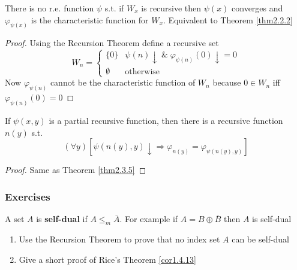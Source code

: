 \documentclass[11pt]{article}
\begin{document}
\begin{theorem}[]
\label{thm2.3.6}
There is no r.e. function \(\psi\) s.t. if \(W_x\) is recursive then \(\psi(x)\)
converges and \(\varphi_{\psi(x)}\) is the characteristic function for
\(W_x\). Equivalent to Theorem \ref{thm2.2.2}
\end{theorem}

\begin{proof}
Using the Recursion Theorem define a recursive set
\begin{equation*}
W_n=
\begin{cases}
\{0\}&\psi(n)\downarrow\;\&\;
\varphi_{\psi(n)}(0)\downarrow=0\\
\emptyset&\text{otherwise}
\end{cases}
\end{equation*}
Now \(\varphi_{\psi(n)}\) cannot be the characteristic function of \(W_n\)
because \(0\in W_n\) iff \(\varphi_{\psi(n)}(0)=0\)
\end{proof}

\begin{theorem}[]
\label{thm2.3.7}
If \(\psi(x,y)\) is a partial recursive function, then there is a recursive
function \(n(y)\) s.t.
\begin{equation*}
(\forall y)[\psi(n(y),y)\downarrow\Longrightarrow\varphi_{n(y)}=\varphi_{\psi(n(y),y)}]
\end{equation*}
\end{theorem}

\begin{proof}
Same as Theorem \ref{thm2.3.5}
\end{proof}
\subsubsection{Exercises}
\label{sec:org7415cc2}
\begin{exercise}
\label{ex2.3.8}
A set \(A\) is \textbf{self-dual} if \(A\le_m\overbar{A}\). For example if
\(A=B\oplus\overbar{B}\) then \(A\) is self-dual
\begin{enumerate}
\item Use the Recursion Theorem to prove that no index set \(A\) can be self-dual
\item Give a short proof of Rice's Theorem \ref{cor1.4.13}
\end{enumerate}
\end{exercise}
\end{document}
